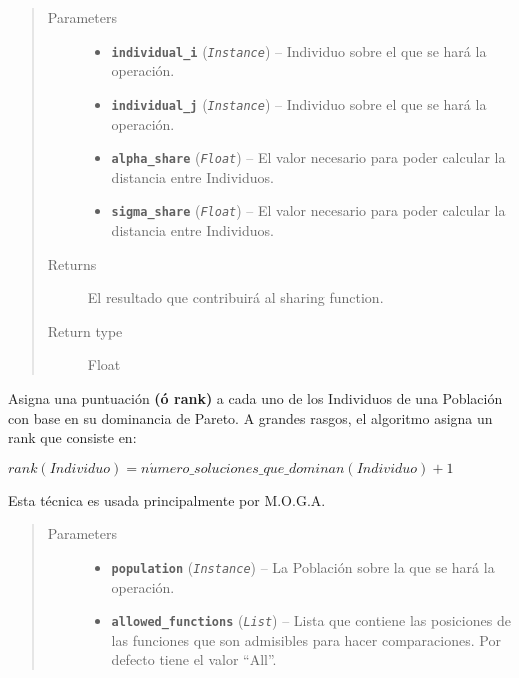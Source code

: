 \documentclass[class=report, crop=false]{standalone}
\begin{document}
\begin{fulllineitems}
\begin{fulllineitems}
\begin{quote}\begin{description}
\item[{Parameters}] \leavevmode\begin{itemize}
\item \textbf{\texttt{individual\_i}} (\emph{\texttt{Instance}}) -- Individuo sobre el que se hará la operación.
\item \textbf{\texttt{individual\_j}} (\emph{\texttt{Instance}}) -- Individuo sobre el que se hará la operación.
\item \textbf{\texttt{alpha\_share}} (\emph{\texttt{Float}}) -- El valor necesario para poder calcular la distancia entre Individuos.
\item \textbf{\texttt{sigma\_share}} (\emph{\texttt{Float}}) -- El valor necesario para poder calcular la distancia entre Individuos.
\end{itemize}
\item[{Returns}] \leavevmode
El resultado que contribuirá al sharing function.
\item[{Return type}] \leavevmode
Float
\end{description}\end{quote}

\end{fulllineitems}

\begin{fulllineitems}

Asigna una puntuación \textbf{(ó rank)} a cada uno de los 
Individuos de una Población con base en su dominancia de Pareto.\break
A grandes rasgos, el algoritmo asigna un rank que consiste en:

\begin{center}\(rank(Individuo) = n\acute{u}mero\_soluciones\_que\_dominan(Individuo) + 1\)
\end{center}

Esta técnica es usada principalmente por M.O.G.A.

\begin{quote}\begin{description}
\item[{Parameters}] \leavevmode\begin{itemize}
\item \textbf{\texttt{population}} (\emph{\texttt{Instance}}) -- La Población sobre la que se hará la operación.
\item \textbf{\texttt{allowed\_functions}} (\emph{\texttt{List}}) -- Lista que contiene las posiciones de las funciones que son admisibles 
para hacer comparaciones. Por defecto tiene el valor ``All''.
\end{itemize}
\end{description}\end{quote}


\end{fulllineitems}
\end{fulllineitems}
\end{document}
